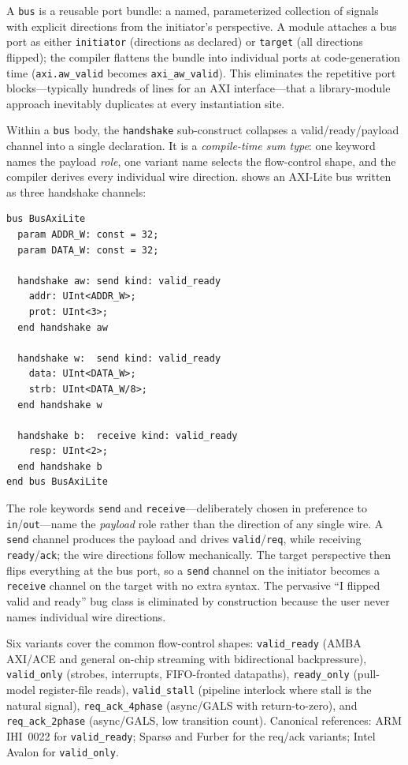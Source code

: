 \documentclass[manuscript]{acmart}
\begin{document}
A \texttt{bus} is a reusable port bundle: a named, parameterized collection of signals with explicit directions from the initiator's perspective. A module attaches a bus port as either \texttt{initiator} (directions as declared) or \texttt{target} (all directions flipped); the compiler flattens the bundle into individual ports at code-generation time (\texttt{axi.aw\_valid} becomes \texttt{axi\_aw\_valid}). This eliminates the repetitive port blocks---typically hundreds of lines for an AXI interface---that a library-module approach inevitably duplicates at every instantiation site.

Within a \texttt{bus} body, the \texttt{handshake} sub-construct collapses a valid/ready/payload channel into a single declaration. It is a \emph{compile-time sum type}: one keyword names the payload \emph{role}, one variant name selects the flow-control shape, and the compiler derives every individual wire direction.  shows an AXI-Lite bus written as three handshake channels:

\begin{lstlisting}[language=Arch,caption={AXI-Lite as three handshake channels},label={lst:handshake}]
bus BusAxiLite
  param ADDR_W: const = 32;
  param DATA_W: const = 32;

  handshake aw: send kind: valid_ready
    addr: UInt<ADDR_W>;
    prot: UInt<3>;
  end handshake aw

  handshake w:  send kind: valid_ready
    data: UInt<DATA_W>;
    strb: UInt<DATA_W/8>;
  end handshake w

  handshake b:  receive kind: valid_ready
    resp: UInt<2>;
  end handshake b
end bus BusAxiLite
\end{lstlisting}

The role keywords \texttt{send} and \texttt{receive}---deliberately chosen in preference to \texttt{in}/\texttt{out}---name the \emph{payload} role rather than the direction of any single wire. A \texttt{send} channel produces the payload and drives \texttt{valid}/\texttt{req}, while receiving \texttt{ready}/\texttt{ack}; the wire directions follow mechanically. The target perspective then flips everything at the bus port, so a \texttt{send} channel on the initiator becomes a \texttt{receive} channel on the target with no extra syntax. The pervasive ``I flipped valid and ready'' bug class is eliminated by construction because the user never names individual wire directions.

Six variants cover the common flow-control shapes: \texttt{valid\_ready} (AMBA AXI/ACE and general on-chip streaming with bidirectional backpressure), \texttt{valid\_only} (strobes, interrupts, FIFO-fronted datapaths), \texttt{ready\_only} (pull-model register-file reads), \texttt{valid\_stall} (pipeline interlock where stall is the natural signal), \texttt{req\_ack\_4phase} (async/GALS with return-to-zero), and \texttt{req\_ack\_2phase} (async/GALS, low transition count). Canonical references: ARM IHI~0022 for \texttt{valid\_ready}; Sparsø and Furber for the req/ack variants; Intel Avalon for \texttt{valid\_only}.
\end{document}
